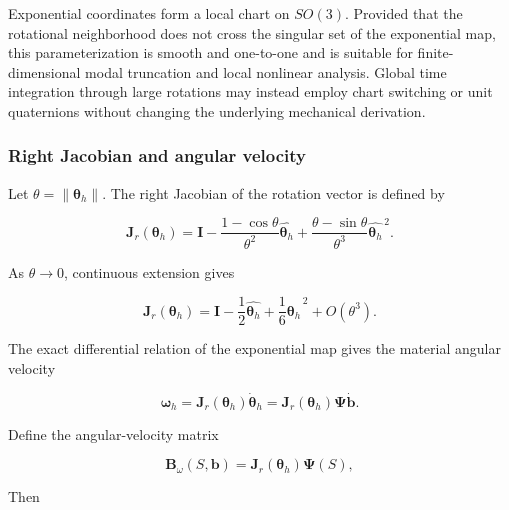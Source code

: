 Exponential coordinates form a local chart on \(SO(3)\). Provided that the rotational neighborhood does not cross the singular set of the exponential map, this parameterization is smooth and one-to-one and is suitable for finite-dimensional modal truncation and local nonlinear analysis. Global time integration through large rotations may instead employ chart switching or unit quaternions without changing the underlying mechanical derivation.

\subsubsection{Right Jacobian and angular velocity}\label{sec:galerkin-2-2-3}

Let \(\theta = \parallel \bm{\theta}_{h} \parallel\). The right Jacobian of the rotation vector is defined by

\begin{equation}
\label{eq:galerkin-2-7}
\mathbf{J}_{r}\left( \bm{\theta}_{h} \right) = \mathbf{I} - \frac{1 - \cos\theta}{\theta^{2}}\widehat{\bm{\theta}_{h}} + \frac{\theta - \sin\theta}{\theta^{3}}{\widehat{\bm{\theta}_{h}}}^{\, 2}.
\end{equation}

As \(\theta \rightarrow 0\), continuous extension gives

\begin{equation}
\label{eq:galerkin-2-8}
\mathbf{J}_{r}\left( \bm{\theta}_{h} \right) = \mathbf{I} - \frac{1}{2}\widehat{\bm{\theta}_{h}} + \frac{1}{6}{\widehat{\bm{\theta}_{h}}}^{\, 2} + O\left( \theta^{3} \right).
\end{equation}

The exact differential relation of the exponential map gives the material angular velocity

\begin{equation}
\label{eq:galerkin-2-9}
\bm{\omega}_{h} = \mathbf{J}_{r}\left( \bm{\theta}_{h} \right){\dot{\bm{\theta}}}_{h} = \mathbf{J}_{r}\left( \bm{\theta}_{h} \right)\bm{\Psi}\dot{\mathbf{b}}.
\end{equation}

Define the angular-velocity matrix

\begin{equation}
\label{eq:galerkin-2-10}
\mathbf{B}_{\omega}\left( S,\mathbf{b} \right) = \mathbf{J}_{r}\left( \bm{\theta}_{h} \right)\bm{\Psi}(S),
\end{equation}

Then

